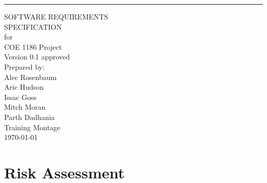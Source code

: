 \documentclass{scrreprt}
\date{}
\def\myversion{0.1 }
\begin{document}
\begin{flushright}
    \rule{16cm}{5pt}\vskip1cm
    \begin{bfseries}
        \Huge{SOFTWARE REQUIREMENTS\\ SPECIFICATION}\\
        \vspace{.9cm}
        for\\
        \vspace{.9cm}
        COE 1186 Project\\
        \vspace{.9cm}
        \LARGE{Version \myversion approved}\\
        \vspace{.9cm}
        Prepared by:\\
        Alec Rosenbaum\\
        Aric Hudson\\
        Issac Goss\\
        Mitch Moran\\
        Parth Dadhania\\
        \vspace{1.9cm}
        Training Montage\\
        \vspace{.9cm}
        \today\\
    \end{bfseries}
\end{flushright}

\chapter{Risk Assessment}
\end{document}

